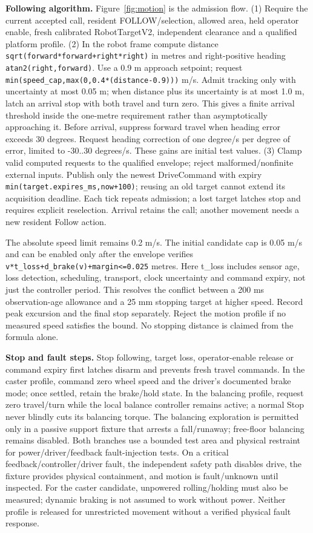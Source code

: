 \documentclass[12pt,letterpaper]{article}
\newcommand{\field}[1]{\texttt{#1}}
\begin{document}
\textbf{Following algorithm.} Figure~\ref{fig:motion} is the admission flow. (1) Require the current accepted call, resident FOLLOW/selection, allowed area, held operator enable, fresh calibrated RobotTargetV2, independent clearance and a qualified platform profile. (2) In the robot frame compute distance \field{sqrt(forward*forward+right*right)} in metres and right-positive heading \field{atan2(right,forward)}. Use a 0.9 m approach setpoint; request \field{min(speed\_\allowbreak{}cap,max(0,0.4*(distance-0.9)))} m/s. Admit tracking only with uncertainty at most 0.05 m; when distance plus its uncertainty is at most 1.0 m, latch an arrival stop with both travel and turn zero. This gives a finite arrival threshold inside the one-metre requirement rather than asymptotically approaching it. Before arrival, suppress forward travel when heading error exceeds 30 degrees. Request heading correction of one degree/s per degree of error, limited to -30..30 degrees/s. These gains are initial test values. (3) Clamp valid computed requests to the qualified envelope; reject malformed/nonfinite external inputs. Publish only the newest DriveCommand with expiry \field{min(target.expires\_\allowbreak{}ms,now+100)}; reusing an old target cannot extend its acquisition deadline. Each tick repeats admission; a lost target latches stop and requires explicit reselection. Arrival retains the call; another movement needs a new resident Follow action.

The absolute speed limit remains 0.2 m/s. The initial candidate cap is 0.05 m/s and can be enabled only after the envelope verifies \field{v*t\_\allowbreak{}loss+d\_\allowbreak{}brake(v)+margin<=0.025} metres. Here t\_\allowbreak{}loss includes sensor age, loss detection, scheduling, transport, clock uncertainty and command expiry, not just the controller period. This resolves the conflict between a 200 ms observation-age allowance and a 25 mm stopping target at higher speed. Record peak excursion and the final stop separately. Reject the motion profile if no measured speed satisfies the bound. No stopping distance is claimed from the formula alone.

\textbf{Stop and fault steps.} Stop following, target loss, operator-enable release or command expiry first latches disarm and prevents fresh travel commands. In the caster profile, command zero wheel speed and the driver's documented brake mode; once settled, retain the brake/hold state. In the balancing profile, request zero travel/turn while the local balance controller remains active; a normal Stop never blindly cuts its balancing torque. The balancing exploration is permitted only in a passive support fixture that arrests a fall/runaway; free-floor balancing remains disabled. Both branches use a bounded test area and physical restraint for power/driver/feedback fault-injection tests. On a critical feedback/controller/driver fault, the independent safety path disables drive, the fixture provides physical containment, and motion is fault/unknown until inspected. For the caster candidate, unpowered rolling/holding must also be measured; dynamic braking is not assumed to work without power. Neither profile is released for unrestricted movement without a verified physical fault response.
\end{document}
